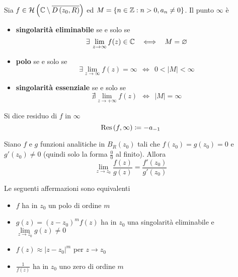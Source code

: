 \begin{thm}
Sia $f\in \mathcal{H} \left(\mathbb{C}  \setminus \overline{D\left(z_{0}, R\right)}\right)$ ed $M = \left\{n\in \mathbb{Z}  :n > 0, a_{n} \neq 0\right\}$. Il punto $\infty $ è

\begin{itemize}
\item \textbf{singolarità eliminabile} se e solo se
\begin{equation*}
\exists \lim\limits_{z\rightarrow \infty} f(z) \in \CC  \ \ \iff \ \ M = \emptyset 
\end{equation*}
\item \textbf{polo} se e solo se
\begin{equation*}
\exists \lim\limits_{z\rightarrow \infty} f(z) = \infty \ \ \iff \ \ 0 < \left| M\right| < \infty 
\end{equation*}
\item \textbf{singolarità essenziale} se e solo se
\begin{equation*}
\nexists \lim\limits_{z\rightarrow + \infty} f(z) \ \ \iff \ \ \left| M\right| = \infty 
\end{equation*}
\end{itemize}
\end{thm}
\begin{defn}
Si dice residuo di $f$ in $\infty $
\begin{equation*}
\operatorname{Res} \left(f, \infty \right) \coloneqq - a_{- 1}
\end{equation*}
\end{defn}
\begin{thm}
[di De l'Hôpital] Siano $f$ e $g$ funzioni analitiche in $B_{R}\left(z_{0}\right)$ tali che $f\left(z_{0}\right) = g\left(z_{0}\right) = 0$ e $g'\left(z_{0}\right) \neq 0$ (quindi solo la forma $\frac{0}{0}$ al finito). Allora
\begin{equation*}
\lim\limits_{z\rightarrow z_{0}}\frac{f(z)}{g(z)} = \frac{f'\left(z_{0}\right)}{g'\left(z_{0}\right)}
\end{equation*}
\end{thm}
\begin{thm}
Le seguenti affermazioni sono equivalenti
\begin{itemize}
\item $f$ ha in $z_{0}$ un polo di ordine $m$
\item $g(z) = \left(z - z_{0}\right)^{m} f(z)$ ha in $z_{0}$ una singolarità eliminabile e $\lim\limits_{z\rightarrow z_{0}} g(z) \neq 0$
\item $f(z) \approx \left| z - z_{0}\right|^{m}$ per $z\rightarrow z_{0}$
\item $\frac{1}{f(z)}$ ha in $z_{0}$ uno zero di ordine $m$
\end{itemize}
\end{thm}
